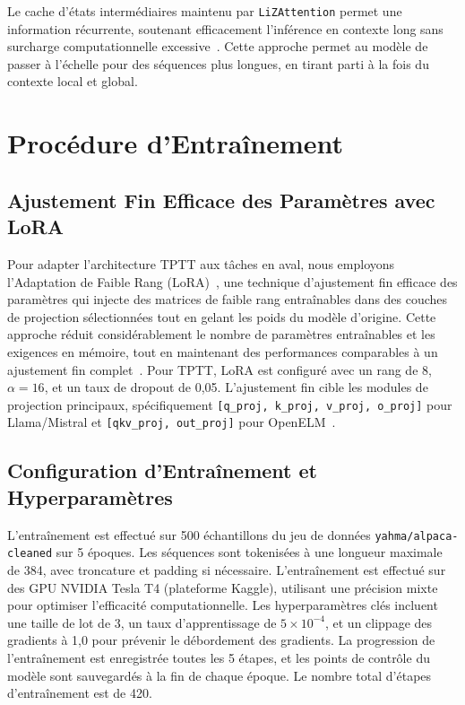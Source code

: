 \documentclass[10pt,a4paper]{article}
\begin{document}
Le cache d'états intermédiaires maintenu par \texttt{LiZAttention} permet une information récurrente, soutenant efficacement l'inférence en contexte long sans surcharge computationnelle excessive~\cite{katharopoulos2020transformers}. Cette approche permet au modèle de passer à l'échelle pour des séquences plus longues, en tirant parti à la fois du contexte local et global.

\section{Procédure d'Entraînement}

\subsection{Ajustement Fin Efficace des Paramètres avec LoRA}

Pour adapter l'architecture TPTT aux tâches en aval, nous employons l'Adaptation de Faible Rang (LoRA)~\cite{hu2022lora, lora_hf}, une technique d'ajustement fin efficace des paramètres qui injecte des matrices de faible rang entraînables dans des couches de projection sélectionnées tout en gelant les poids du modèle d'origine. Cette approche réduit considérablement le nombre de paramètres entraînables et les exigences en mémoire, tout en maintenant des performances comparables à un ajustement fin complet~\cite{hu2022lora, lora_hf}. Pour TPTT, LoRA est configuré avec un rang de 8, $\alpha=16$, et un taux de dropout de 0,05. L'ajustement fin cible les modules de projection principaux, spécifiquement \texttt{[q\_proj, k\_proj, v\_proj, o\_proj]} pour Llama/Mistral et \texttt{[qkv\_proj, out\_proj]} pour OpenELM~\cite{lora_hf}.

\subsection{Configuration d'Entraînement et Hyperparamètres}

L'entraînement est effectué sur 500 échantillons du jeu de données \texttt{yahma/alpaca-cleaned} sur 5 époques. Les séquences sont tokenisées à une longueur maximale de 384, avec troncature et padding si nécessaire. L'entraînement est effectué sur des GPU NVIDIA Tesla T4 (plateforme Kaggle), utilisant une précision mixte pour optimiser l'efficacité computationnelle. Les hyperparamètres clés incluent une taille de lot de 3, un taux d'apprentissage de $5 \times 10^{-4}$, et un clippage des gradients à 1,0 pour prévenir le débordement des gradients. La progression de l'entraînement est enregistrée toutes les 5 étapes, et les points de contrôle du modèle sont sauvegardés à la fin de chaque époque. Le nombre total d'étapes d'entraînement est de 420.
\end{document}
